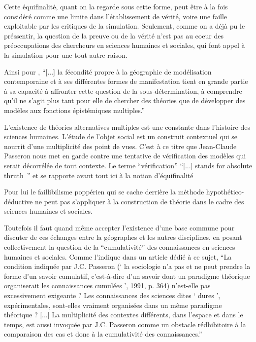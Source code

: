 Cette équifinalité, quant on la regarde sous cette forme, peut être à la fois considéré comme une limite dans l'établissement de vérité, voire une faille exploitable par les critiques de la simulation. Seulement, comme on a déjà pu le préssentir, la question de la preuve ou de la vérité n'est pas au coeur des préoccupations des chercheurs en sciences humaines et sociales, qui font appel à la simulation pour une tout autre raison. 

Ainsi pour \autocite{Varenne2014},  \enquote{[...] la fécondité propre à la géographie de modélisation contemporaine et à ses différentes formes de manifestation tient en grande partie à sa capacité à affronter cette question de la sous-détermination, à comprendre qu’il ne s’agit plus tant pour elle de chercher des théories que de développer des modèles aux fonctions épistémiques multiples.} 

L’existence de théories alternatives multiples est une constante dans l’histoire des sciences humaines. L'étude de l'objet social est un construit contextuel qui se nourrit d'une multiplicité des point de vues. C'est à ce titre que Jean-Claude Passeron \autocite{Passeron2006} nous met en garde contre une tentative de vérification des modèles qui serait décorrélée de tout contexte. Le terme \enquote{vérification} \foreignquote{english}{[...] stands for absolute thruth } \autocites{David2009, Oreskes1994} et se rapporte avant tout ici à la notion d'équifinalité \autocite{OSullivan2004} 

Pour lui le faillibilisme poppérien qui se cache derrière la méthode hypothético-déductive ne peut pas s'appliquer à la construction de théorie dans le cadre des sciences humaines et sociales. 

Toutefois il faut quand même accepter l'existence d'une base commune pour discuter de ces échanges entre la géographes et les autres disciplines, en posant collectivement la question de la \enquote{cumulativité}  des connaissances en sciences humaines et sociales. Comme l'indique \textcite{Pumain2005} dans un article dédié à ce sujet, \enquote{La condition indiquée par J.C. Passeron (\enquote{ la sociologie n’a pas et ne peut prendre la forme d’un savoir cumulatif, c’est-à-dire d’un savoir dont un paradigme théorique organiserait les connaissances cumulées }, 1991, p. 364) n’est-elle pas excessivement exigeante ? Les connaissances des sciences dites \enquote{ dures }, expérimentales, sont-elles vraiment organisées dans un même paradigme théorique ? [...] La multiplicité des contextes différents, dans l’espace et dans le temps, est aussi invoquée par J.C. Passeron comme un obstacle rédhibitoire à la comparaison des cas et donc à la cumulativité des connaissances.} 


